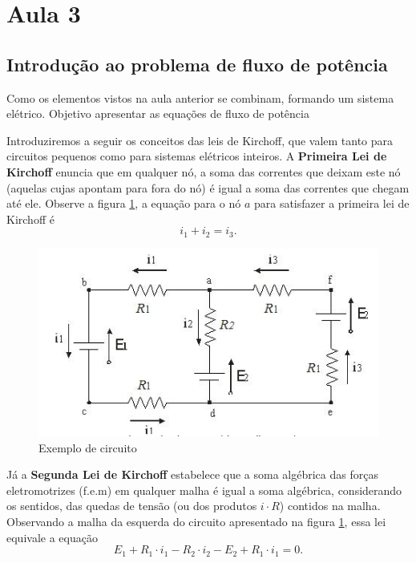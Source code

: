 

\section{Aula 3}


\subsection{Introdução ao problema de fluxo de potência}

Como os elementos vistos na aula anterior se combinam, formando um
sistema elétrico. Objetivo apresentar as equações de fluxo de potência 

Introduziremos a seguir os conceitos das leis de Kirchoff, que valem
tanto para circuitos pequenos como para sistemas elétricos inteiros.
A\textbf{ Primeira Lei de Kirchoff} enuncia que em qualquer nó, a
soma das correntes que deixam este nó (aquelas cujas apontam para
fora do nó) é igual a soma das correntes que chegam até ele. Observe
a figura \ref{fig:Exemplo-de-circuito}, a equação para o nó $a$
para satisfazer a primeira lei de Kirchoff é 
\[
i_{1}+i_{2}=i_{3}.
\]


\begin{figure}
\begin{centering}
\includegraphics{anexos/aula3_circuito}
\par\end{centering}

\protect\caption{\label{fig:Exemplo-de-circuito}Exemplo de circuito}
\end{figure}


Já a \textbf{Segunda Lei de Kirchoff} estabelece que a soma algébrica
das forças eletromotrizes (f.e.m) em qualquer malha é igual a soma
algébrica, considerando os sentidos, das quedas de tensão (ou dos
produtos $i\cdot R$) contidos na malha. Observando a malha da esquerda
do circuito apresentado na figura \ref{fig:Exemplo-de-circuito},
essa lei equivale a equação
\[
E_{1}+R_{1}\cdot i_{1}-R_{2}\cdot i_{2}-E_{2}+R_{1}\cdot i_{1}=0.
\]


